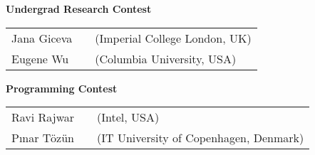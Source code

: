 {\vfill
\textbf{Undergrad Research Contest}

\begin{tabular}{lp{.5em}l}
Jana Giceva	&& \textsf{\small(Imperial College London, UK)}	\\
Eugene Wu	&& \textsf{\small(Columbia University, USA)}
\end{tabular}

\vfill
\textbf{Programming Contest}

\begin{tabular}{lp{.5em}l}
Ravi Rajwar	&& \textsf{\small(Intel, USA)}	\\
Pınar Tözün	&& \textsf{\small(IT University of Copenhagen, Denmark)}
\end{tabular}

}
